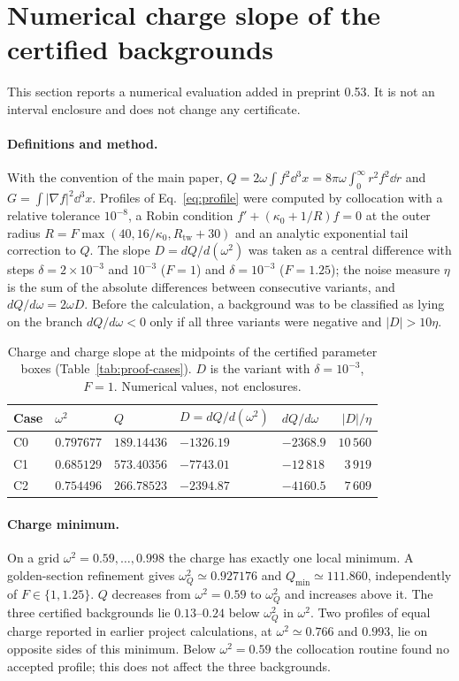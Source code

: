 \section{Numerical charge slope of the certified backgrounds}\label{supp:charge-slope}
This section reports a numerical evaluation added in preprint 0.53. It is
not an interval enclosure and does not change any certificate.

\paragraph{Definitions and method.}
With the convention of the main paper, $Q=2\omega\int f^2\dd^3x=
8\pi\omega\int_0^\infty r^2f^2\dd r$ and $G=\int|\nabla f|^2\dd^3x$.
Profiles of Eq.~\eqref{eq:profile} were computed by collocation with a
relative tolerance $10^{-8}$, a Robin condition
$f'+(\kappa_0+1/R)f=0$ at the outer radius
$R=F\max(40,16/\kappa_0,R_{\mathrm{tw}}+30)$ and an analytic exponential
tail correction to $Q$. The slope $D=dQ/d(\omega^2)$ was taken as a
central difference with steps $\delta=2\times10^{-3}$ and $10^{-3}$
($F=1$) and $\delta=10^{-3}$ ($F=1.25$); the noise measure $\eta$ is
the sum of the absolute differences between consecutive variants, and
$dQ/d\omega=2\omega D$. Before the calculation, a background was to be
classified as lying on the branch $dQ/d\omega<0$ only if all three
variants were negative and $|D|>10\eta$.

\begin{table}[htbp]\centering\small
\caption{Charge and charge slope at the midpoints of the certified
parameter boxes (Table~\ref{tab:proof-cases}). $D$ is the variant with
$\delta=10^{-3}$, $F=1$. Numerical values, not enclosures.}
\label{tab:charge-slope}
\begin{tabular}{lllllr}\toprule
Case&$\omega^2$&$Q$&$D=dQ/d(\omega^2)$&$dQ/d\omega$&$|D|/\eta$\\\midrule
C0&$0.797677$&$189.14436$&$-1326.19$&$-2368.9$&$10\,560$\\
C1&$0.685129$&$573.40356$&$-7743.01$&$-12\,818$&$3\,919$\\
C2&$0.754496$&$266.78523$&$-2394.87$&$-4160.5$&$7\,609$\\\bottomrule
\end{tabular}
\end{table}

\paragraph{Charge minimum.}
On a grid $\omega^2=0.59,\dots,0.998$ the charge has exactly one local
minimum. A golden-section refinement gives
$\omega_Q^2\simeq0.927176$ and $Q_{\min}\simeq111.860$, independently of
$F\in\{1,1.25\}$. $Q$ decreases from $\omega^2=0.59$ to $\omega_Q^2$ and
increases above it. The three certified backgrounds lie $0.13$--$0.24$
below $\omega_Q^2$ in $\omega^2$. Two profiles of equal charge reported
in earlier project calculations, at $\omega^2\simeq0.766$ and $0.993$, lie
on opposite sides of this minimum. Below $\omega^2=0.59$ the collocation
routine found no accepted profile; this does not affect the three
backgrounds.

